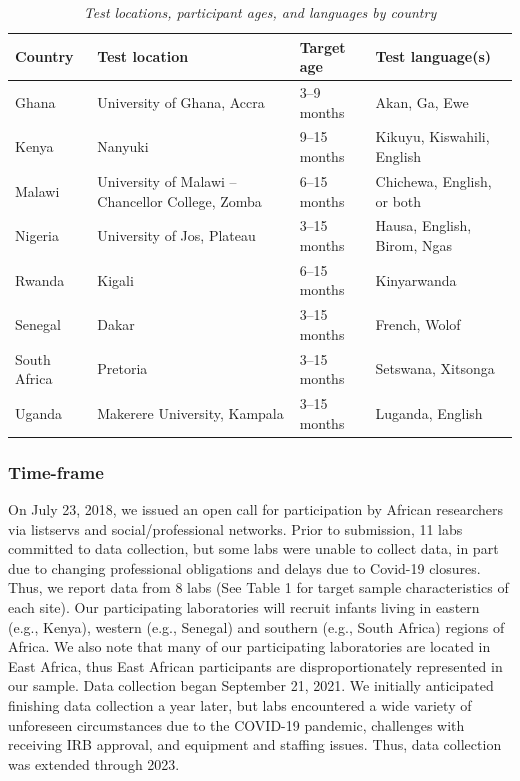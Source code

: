 \documentclass[
  ,man,floatsintext]{apa6}
\begin{document}
\begin{table}[!t]
\caption{\textit{Test locations, participant ages, and languages by country}}
\label{tab:test_locations}
\centering
\begin{tabularx}{\textwidth}{lXlX}
\toprule
\textbf{Country} & \textbf{Test location} & \textbf{Target age} & \textbf{Test language(s)} \\
\midrule
Ghana & University of Ghana, Accra & 3--9 months & Akan, Ga, Ewe \\
Kenya & Nanyuki & 9--15 months & Kikuyu, Kiswahili, English \\
Malawi & University of Malawi -- Chancellor College, Zomba & 6--15 months & Chichewa, English, or both \\
Nigeria & University of Jos, Plateau & 3--15 months & Hausa, English, Birom, Ngas \\
Rwanda & Kigali & 6--15 months & Kinyarwanda \\
Senegal & Dakar & 3--15 months & French, Wolof \\
South Africa & Pretoria & 3--15 months & Setswana, Xitsonga \\
Uganda & Makerere University, Kampala & 3--15 months & Luganda, English \\
\bottomrule
\end{tabularx}
\end{table}

\hypertarget{time-frame}{%
\subsubsection{Time-frame}\label{time-frame}}

On July 23, 2018, we issued an open call for participation by African researchers via listservs and social/professional networks. Prior to submission, 11 labs committed to data collection, but some labs were unable to collect data, in part due to changing professional obligations and delays due to Covid-19 closures. Thus, we report data from 8 labs (See Table 1 for target sample characteristics of each site). Our participating laboratories will recruit infants living in eastern (e.g., Kenya), western (e.g., Senegal) and southern (e.g., South Africa) regions of Africa. We also note that many of our participating laboratories are located in East Africa, thus East African participants are disproportionately represented in our sample. Data collection began September 21, 2021. We initially anticipated finishing data collection a year later, but labs encountered a wide variety of unforeseen circumstances due to the COVID-19 pandemic, challenges with receiving IRB approval, and equipment and staffing issues. Thus, data collection was extended through 2023.
\end{document}
